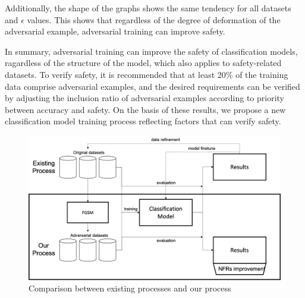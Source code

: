 \documentclass[journal,article,submit,moreauthors,pdftex]{Definitions/mdpi}
\begin{document}
Additionally, the shape of the graphs shows the same tendency for all datasets and \begin{math}\epsilon\end{math} values.
This shows that regardless of the degree of deformation of the adversarial example, adversarial training can improve safety.

In summary, adversarial training can improve the safety of classification models, ragardless of the structure of the model, which also applies to safety-related datasets.
To verify safety, it is recommended that at least 20\% of the training data comprise adversarial examples, and the desired requirements can be verified by adjusting the inclusion ratio of adversarial examples according to priority between accuracy and safety.
On the basis of these results, we propose a new classification model training process reflecting factors that can verify safety.

\begin{figure}[H]
    \includegraphics[width=13 cm]{Definitions/comparison.png}
    \caption{Comparison between existing processes and our process\label{comparison}}
\end{figure} 
\end{document}
